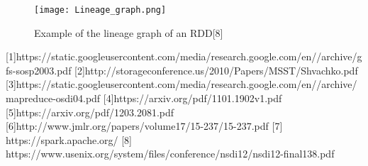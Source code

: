 \begin{figure}
  \texttt{[image: Lineage\_graph.png]}
  \caption{Example of the lineage graph of an RDD[8]}
  \label{lineagegraph}
\end{figure}








[1]https://static.googleusercontent.com/media/research.google.com/en//archive/gfs-sosp2003.pdf %
[2]http://storageconference.us/2010/Papers/MSST/Shvachko.pdf %
[3]https://static.googleusercontent.com/media/research.google.com/en//archive/mapreduce-osdi04.pdf %
[4]https://arxiv.org/pdf/1101.1902v1.pdf %
[5]https://arxiv.org/pdf/1203.2081.pdf %
[6]http://www.jmlr.org/papers/volume17/15-237/15-237.pdf %
[7] https://spark.apache.org/ %
[8] https://www.usenix.org/system/files/conference/nsdi12/nsdi12-final138.pdf %
